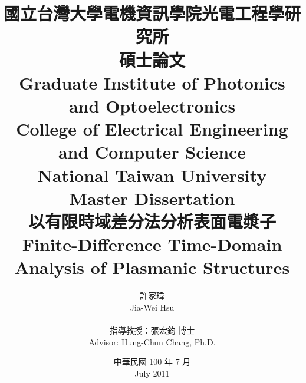 \title{
  \kai 國立台灣大學電機資訊學院光電工程學研究所\\碩士論文\\
  \rm Graduate Institute of Photonics and Optoelectronics\\College of Electrical Engineering and Computer Science\\National Taiwan University\\Master Dissertation\\[1cm]
  \kai 以有限時域差分法分析表面電漿子\\
  \rm Finite-Difference Time-Domain Analysis of Plasmanic Structures
}
\author{
  \kai 許家瑋\\ \rm Jia-Wei Hsu\\\\
  \kai 指導教授：張宏鈞 博士\\ \rm Advisor: Hung-Chun Chang, Ph.D.
}
\date{
  \kai 中華民國 100 年 7 月\\ 
  \rm July 2011
}

\maketitle
{}

